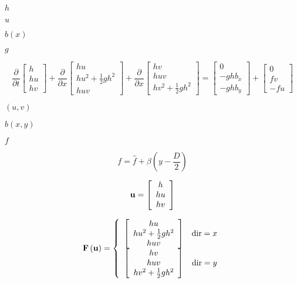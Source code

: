 \documentclass{article}
\begin{document}
$h$
\pagebreak

$u$
\pagebreak

$b(x)$
\pagebreak

$g$
\pagebreak

\begin{equation} \frac {\partial} {\partial t} \left[\begin{array}{c} h \\ hu \\ hv \end{array} \right] + \frac {\partial} {\partial x} \left[\begin{array}{c} hu \\ hu^2 + \frac{1}{2}gh^2 \\ huv \end{array} \right] + \frac {\partial} {\partial x} \left[\begin{array}{c} hv \\ huv \\ hv^2 + \frac{1}{2}gh^2 \end{array} \right] = \left[\begin{array}{c} 0 \\ -ghb_x \\ -ghb_y \end{array}\right] + \left[\begin{array}{c} 0 \\ fv \\ -fu \end{array}\right] \end{equation}
\pagebreak

$\left(u,v\right)$
\pagebreak

$b(x,y)$
\pagebreak

$f$
\pagebreak

\begin{equation} f = \hat{f} + \beta\left( y - \frac{D}{2} \right) \end{equation}
\pagebreak

\begin{equation} {\bf u} = \left[\begin{array}{c} h \\ hu \\ hv \end{array}\right] \end{equation}
\pagebreak

\begin{equation} {\bf F}\left({\bf u}\right) = \left\{\begin{array}{cc} \left[\begin{array}{c} hu \\ hu^2 + \frac{1}{2} gh^2 \\ huv \end{array}\right] & {\rm dir} = x \\ \left[\begin{array}{c} hv \\ huv \\ hv^2 + \frac{1}{2} gh^2 \end{array}\right] & {\rm dir} = y \\ \end{array}\right. \end{equation}
\pagebreak
\end{document}
